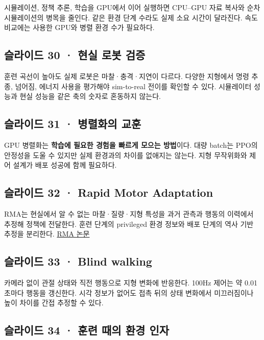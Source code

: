 \documentclass[11pt,a4paper]{article}
\begin{document}
시뮬레이션, 정책 추론, 학습을 GPU에서 이어 실행하면 CPU–GPU 자료 복사와 순차 시뮬레이션의 병목을 줄인다. 같은 환경 단계 수라도 실제 소요 시간이 달라진다. 속도 비교에는 사용한 GPU와 병렬 환경 수가 필요하다.\par

\subsection{슬라이드 30 · 현실 로봇 검증}

훈련 곡선이 높아도 실제 로봇은 마찰·충격·지연이 다르다. 다양한 지형에서 명령 추종, 넘어짐, 에너지 사용을 평가해야 sim-to-real 전이를 확인할 수 있다. 시뮬레이터 성능과 현실 성능을 같은 축의 숫자로 혼동하지 않는다.\par

\subsection{슬라이드 31 · 병렬화의 교훈}

GPU 병렬화는 \textbf{학습에 필요한 경험을 빠르게 모으는 방법}이다. 대량 batch는 PPO의 안정성을 도울 수 있지만 실제 환경과의 차이를 없애지는 않는다. 지형 무작위화와 제어 설계가 배포 성공에 함께 필요하다.\par

\subsection{슬라이드 32 · Rapid Motor Adaptation}

RMA는 현실에서 알 수 없는 마찰·질량·지형 특성을 과거 관측과 행동의 이력에서 추정해 정책에 전달한다. 훈련 단계의 privileged 환경 정보와 배포 단계의 역사 기반 추정을 분리한다. \href{https://arxiv.org/abs/2107.04034}{RMA 논문}\par

\subsection{슬라이드 33 · Blind walking}

카메라 없이 관절 상태와 직전 행동으로 지형 변화에 반응한다. 100Hz 제어는 약 0.01초마다 행동을 갱신한다. 시각 정보가 없어도 접촉 뒤의 상태 변화에서 미끄러짐이나 높이 차이를 간접 추정할 수 있다.\par

\subsection{슬라이드 34 · 훈련 때의 환경 인자}
\end{document}
